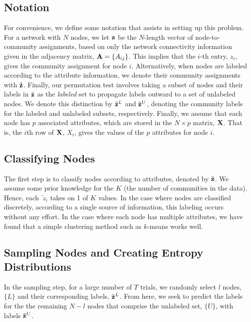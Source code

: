 \subsection{Notation}
For convenience, we define some notation that assists in setting up this problem. For a network with $N$ nodes, we let ${\bf z}$ be the $N$-length vector of node-to-community assignments, based on only the network connectivity information given in the adjacency matrix, ${\bf A}=\{A_{ij}\}$. This implies that the $i$-th entry, $z_{i}$, gives the community assignment for node $i$. Alternatively, when nodes are labeled according to the attribute information, we denote their community assignments with $\tilde{{\bf z}}$.  Finally, our permutation test involves taking a subset of nodes and their labels in $\tilde{{\bf z}}$ as the \emph{labeled} set to propagate labels outward to a set of unlabeled nodes. We denote this distinction by $\tilde{{\bf z}}^{L}$ and $\tilde{{\bf z}}^{U}$, denoting the community labels for the labeled and unlabeled subsets, respectively. Finally, we assume that each node has $p$ associated attributes, which are stored in the $N \times p$ matrix, ${\bf X}$. That is, the $i$th row of ${\bf X}$, $X_{i}$, gives the values of the $p$ attributes for node $i$. 

\subsection{Classifying Nodes}
The first step is to classify nodes according to attributes, denoted by $\tilde{{\bf z}}$. We assume some prior knowledge for the $K$ (the number of communities in the data). Hence, each $\tilde{{\ z}}_{i}$ takes on 1 of $K$ values. In the case where nodes are classified discretely, according to a single source of information, this labeling occurs without any effort. In the case where each node has multiple attributes, we have found that a simple clustering method such as $k$-means works well. 

\subsection{Sampling Nodes and Creating Entropy Distributions}
In the sampling step, for a large number of $T$ trials, we randomly select $l$ nodes, $\{L\}$ and their corresponding labels, $\tilde{{\bf z}}^{L}$. From here, we seek to predict the labels for the the remaining $N-l$ nodes that comprise the unlabeled set, $\{U\}$, with labels $\tilde{{\bf z}}^{U}$. 

